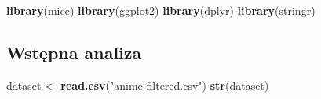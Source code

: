 \documentclass[
]{article}
\newenvironment{Shaded}{\begin{snugshade}}{\end{snugshade}}
\newcommand{\FunctionTok}[1]{\textcolor[rgb]{0.13,0.29,0.53}{\textbf{#1}}}
\newcommand{\NormalTok}[1]{#1}
\newcommand{\OtherTok}[1]{\textcolor[rgb]{0.56,0.35,0.01}{#1}}
\newcommand{\StringTok}[1]{\textcolor[rgb]{0.31,0.60,0.02}{#1}}
\begin{document}
\begin{Shaded}
\begin{Highlighting}[]
\FunctionTok{library}\NormalTok{(mice)}
\FunctionTok{library}\NormalTok{(ggplot2)}
\FunctionTok{library}\NormalTok{(dplyr)}
\FunctionTok{library}\NormalTok{(stringr)}
\end{Highlighting}
\end{Shaded}

\subsection{Wstępna analiza}\label{wstux119pna-analiza}

\begin{Shaded}
\begin{Highlighting}[]
\NormalTok{dataset }\OtherTok{\textless{}{-}} \FunctionTok{read.csv}\NormalTok{(}\StringTok{"anime{-}filtered.csv"}\NormalTok{)}
\FunctionTok{str}\NormalTok{(dataset)}
\end{Highlighting}
\end{Shaded}
\end{document}
